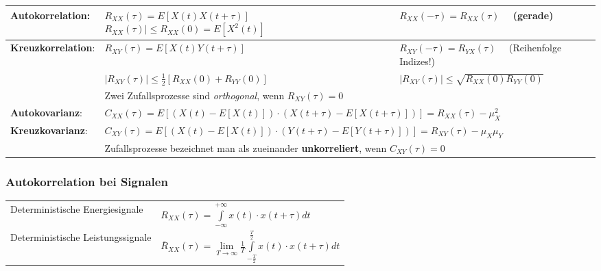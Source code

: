 \renewcommand{\arraystretch}{1.6}
\begin{tabular}[c]{|p{4cm}|p{6cm}|p{7.5cm}|}
	\hline
	\textbf{Autokorrelation}: 	&
		$R_{XX}(\tau) = E[X(t)X(t+\tau)]$\newline
  		$R_{XX}(\tau) \! \mid \leq R_{XX}(0) = E[X^{2}(t)]$ 
		&$R_{XX}(-\tau) = R_{XX}(\tau) \quad$ (gerade)\\
	\hline
  	\textbf{Kreuzkorrelation}: 	& 	
 		$R_{XY}(\tau) = E[X(t)Y(t+\tau)]$  
		& $R_{XY}(-\tau) = R_{YX}(\tau) \quad$ (Reihenfolge Indizes!) \\
		& $|R_{XY}(\tau)| \leq \frac{1}{2} \left[ R_{XX}(0)+R_{YY}(0)\right] $
		& $|R_{XY}(\tau)|  \leq \sqrt{R_{XX}(0)R_{YY}(0)}$ \\
		& \multicolumn{2}{l|}{Zwei Zufallsprozesse sind \textit{orthogonal}, wenn $R_{XY}(\tau) = 0$}\\
	\hline
  	\textbf{Autokovarianz}: 	&  
		\multicolumn{2}{l|}{$C_{XX}(\tau) = E\!\left[ \left( X(t)      - E[X(t)]      \right) \cdot
    	\left( X(t+\tau) - E[X(t+\tau)] \right) \right] =
   		R_{XX}(\tau) - \mu^{2}_{X} $} \\
   	\hline
  	\textbf{Kreuzkovarianz}: 	& 	
   		\multicolumn{2}{l|}{$C_{XY}(\tau) = E\!\left[ \left( X(t)      - E[X(t)]      \right) \cdot
        \left( Y(t+\tau) - E[Y(t+\tau)] \right) \right] = R_{XY}(\tau) - \mu_{X}\mu_{Y} $}\\
  	  	& \multicolumn{2}{l|}{Zufallsprozesse bezeichnet man als zueinander \textbf{unkorreliert}, wenn $C_{XY}(\tau) =0$}\\
   	\hline
\end{tabular}
\renewcommand{\arraystretch}{1}

\subsubsection{Autokorrelation bei Signalen}
	\begin{tabular}[c]{ll}
		Deterministische Energiesignale 
		& $ R_{XX}(\tau) = \int\limits_{-\infty}^{+\infty} x(t) \cdot x(t+\tau) dt$ \\
		Deterministische Leistungssignale
		& $\overline{R}_{XX}(\tau) = \lim\limits_{T\rightarrow\infty}\frac{1}{T}\int\limits_{-\frac{T}{2}}^{\frac{T}{2}} x(t) \cdot x(t+\tau) dt$ \\
	\end{tabular}\\
	
